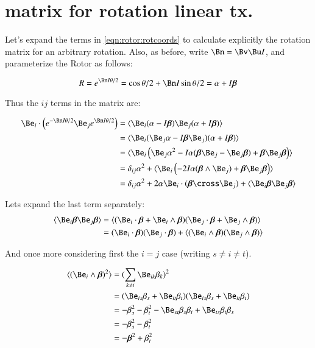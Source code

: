 \section{matrix for rotation linear tx. }

Let's expand the terms in \ref{eqn:rotor:rotcoords} to calculate explicitly the rotation matrix for an arbitrary
rotation.  Also, as before, write $\Bn = \Bv\Bu I$, and parameterize the Rotor as follows:

\[
R = e^{\Bn I \theta/2} = \cos{\theta/2} + \Bn I \sin{\theta/2} = \alpha + I\Bbeta
\]

Thus the $ij$ terms in the matrix are:

\begin{align*}
\Be_i \cdot \left(e^{-\Bn I \theta/2} \Be_j e^{\Bn I \theta/2}\right)
&= \langle{ \Be_i (\alpha -I\Bbeta) \Be_j (\alpha +I\Bbeta) } \rangle \\
&= \langle{ \Be_i (\Be_j \alpha -I\Bbeta\Be_j) (\alpha +I\Bbeta) } \rangle \\
&= \langle{ \Be_i \left( \Be_j \alpha^2 -I\alpha(\Bbeta\Be_j - \Be_j\Bbeta) + \Bbeta\Be_j\Bbeta \right) } \rangle \\
&= \delta_{ij}\alpha^2 + \langle{ \Be_i \left( -2I\alpha(\Bbeta \wedge \Be_j) + \Bbeta\Be_j\Bbeta \right) } \rangle \\
&= \delta_{ij}\alpha^2 + 2\alpha \Be_i \cdot (\Bbeta \cross \Be_j) + \langle{ \Be_i \Bbeta \Be_j \Bbeta } \rangle \\
\end{align*}

Lets expand the last term separately:
\begin{align*}
\langle{ \Be_i \Bbeta \Be_j \Bbeta } \rangle 
&= \langle{ ( \Be_i \cdot \Bbeta + \Be_i \wedge \Bbeta) ( \Be_j \cdot \Bbeta + \Be_j \wedge \Bbeta) } \rangle  \\
&= (\Be_i \cdot \Bbeta)(\Be_j \cdot \Bbeta) + \langle{ (\Be_i \wedge \Bbeta) ( \Be_j \wedge \Bbeta) } \rangle  \\
\end{align*}

And once more considering first the $i=j$ case (writing $s \ne i \ne t$).

\begin{align*}
\langle{ (\Be_i \wedge \Bbeta)^2 }\rangle 
&= (\sum_{k \ne i}{ \Be_{ik} \beta_k})^2 \\
&= ( \Be_{is} \beta_s + \Be_{it} \beta_t ) ( \Be_{is} \beta_s + \Be_{it} \beta_t ) \\
&= -\beta_s^2 -\beta_t^2 -  \Be_{st} \beta_s \beta_t + \Be_{ts} \beta_t \beta_s  \\
&= -\beta_s^2 -\beta_t^2 \\
&= -\Bbeta^2 + \beta_i^2 \\
\end{align*}

